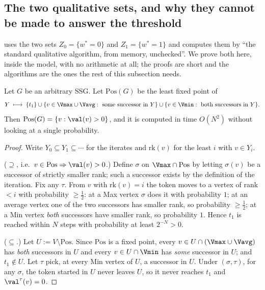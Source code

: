 
\subsection{The two qualitative sets, and why they cannot be made to answer the
threshold}\label{sec:fs16}

 uses the two sets $Z_0=\{w^\ast=0\}$ and
$Z_1=\{w^\ast=1\}$ and computes them by ``the standard qualitative algorithm,
from memory, unchecked''. We prove both here, inside the model, with no
arithmetic at all; the proofs are short and the algorithms are the ones the
rest of this subsection needs.

\begin{lemma}\label{lem:fs16-positive}
Let $G$ be an arbitrary SSG. Let $\mathrm{Pos}(G)$ be the least fixed point of
\[
  Y\;\longmapsto\;\{t_1\}\cup\{v\in\Vmax\cup\Vavg:\ \text{some successor in }Y\}
                    \cup\{v\in\Vmin:\ \text{both successors in }Y\}.
\]
Then $\mathrm{Pos}(G)=\{v:\val(v)>0\}$, and it is computed in time $O(N^2)$
without looking at a single probability.
\end{lemma}

\begin{proof}
Write $Y_0\subseteq Y_1\subseteq\cdots$ for the iterates and
$\mathrm{rk}(v)$ for the least $i$ with $v\in Y_i$.

($\supseteq$, i.e.\ $v\in\mathrm{Pos}\Rightarrow\val(v)>0$.)
Define $\sigma$ on $\Vmax\cap\mathrm{Pos}$ by letting $\sigma(v)$ be a
successor of strictly smaller rank; such a successor exists by the definition
of the iteration. Fix any $\tau$. From $v$ with $\mathrm{rk}(v)=i$ the token
moves to a vertex of rank $<i$ with probability $\ge\tfrac12$: at a Max vertex
$\sigma$ does it with probability $1$; at an average vertex one of the two
successors has smaller rank, so probability $\ge\tfrac12$; at a Min vertex
\emph{both} successors have smaller rank, so probability $1$. Hence
$t_1$ is reached within $N$ steps with probability at least $2^{-N}>0$.

($\subseteq$.) Let $U:=V\setminus\mathrm{Pos}$. Since $\mathrm{Pos}$ is a fixed
point, every $v\in U\cap(\Vmax\cup\Vavg)$ has \emph{both} successors in $U$ and
every $v\in U\cap\Vmin$ has \emph{some} successor in $U$; and $t_1\notin U$.
Let $\tau$ pick, at every Min vertex of $U$, a successor in $U$. Under
$(\sigma,\tau)$, for any $\sigma$, the token started in $U$ never leaves $U$,
so it never reaches $t_1$ and $\val^{\tau}(v)=0$.
\end{proof}

